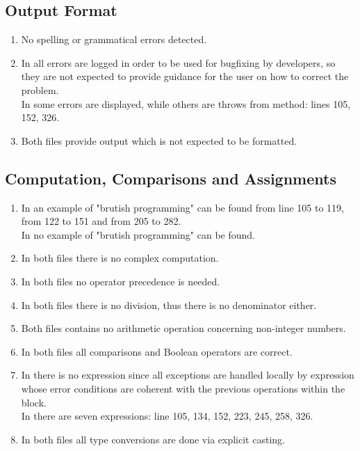 \subsection{Output Format}
\begin{enumerate}[NUM]
    \item No spelling or grammatical errors detected.
    
    \item In  all errors are logged in order to be used for bugfixing by developers, so they are not expected to provide guidance for the user on how to correct the problem.\\
    In  some errors are displayed, while others are throws from method: lines 105, 152, 326.%
    
    \item Both files provide output which is not expected to be formatted.
\end{enumerate}

\subsection{Computation, Comparisons and Assignments}
\begin{enumerate}[NUM]
    \item In  an example of "brutish programming" can be found from line 105 to 119, from 122 to 151 and from 205 to 282.\\
    In  no example of "brutish programming" can be found. %
    
    \item In both files there is no complex computation.
    
    \item In both files no operator precedence is needed.
    
    \item In both files there is no division, thus there is no denominator either.
    
    \item Both files contains no arithmetic operation concerning non-integer numbers.
    
    
    \item In both files all comparisons and Boolean operators are correct.
    
    \item In  there is no  expression since all exceptions are handled locally by  expression whose error conditions are coherent with the previous operations within the  block.\\
    In  there are seven  expressions: line 105, 134, 152, 223, 245, 258, 326.
    
    \item In both files all type conversions are done via explicit casting.
\end{enumerate}

